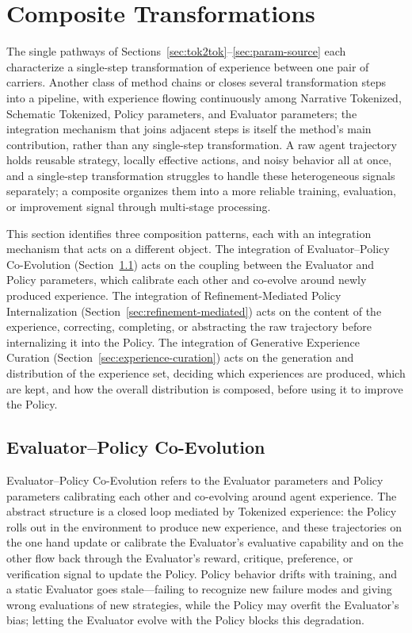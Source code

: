 \section{Composite Transformations}
\label{sec:composite}

The single pathways of Sections~\ref{sec:tok2tok}--\ref{sec:param-source} each characterize a single-step transformation of experience between one pair of carriers. Another class of method chains or closes several transformation steps into a pipeline, with experience flowing continuously among Narrative Tokenized, Schematic Tokenized, Policy parameters, and Evaluator parameters; the integration mechanism that joins adjacent steps is itself the method's main contribution, rather than any single-step transformation. A raw agent trajectory holds reusable strategy, locally effective actions, and noisy behavior all at once, and a single-step transformation struggles to handle these heterogeneous signals separately; a composite organizes them into a more reliable training, evaluation, or improvement signal through multi-stage processing.

This section identifies three composition patterns, each with an integration mechanism that acts on a different object. The integration of Evaluator--Policy Co-Evolution (Section~\ref{sec:coevolution}) acts on the coupling between the Evaluator and Policy parameters, which calibrate each other and co-evolve around newly produced experience. The integration of Refinement-Mediated Policy Internalization (Section~\ref{sec:refinement-mediated}) acts on the content of the experience, correcting, completing, or abstracting the raw trajectory before internalizing it into the Policy. The integration of Generative Experience Curation (Section~\ref{sec:experience-curation}) acts on the generation and distribution of the experience set, deciding which experiences are produced, which are kept, and how the overall distribution is composed, before using it to improve the Policy.

\subsection{Evaluator--Policy Co-Evolution}
\label{sec:coevolution}

Evaluator--Policy Co-Evolution refers to the Evaluator parameters and Policy parameters calibrating each other and co-evolving around agent experience. The abstract structure is a closed loop mediated by Tokenized experience: the Policy rolls out in the environment to produce new experience, and these trajectories on the one hand update or calibrate the Evaluator's evaluative capability and on the other flow back through the Evaluator's reward, critique, preference, or verification signal to update the Policy. Policy behavior drifts with training, and a static Evaluator goes stale---failing to recognize new failure modes and giving wrong evaluations of new strategies, while the Policy may overfit the Evaluator's bias; letting the Evaluator evolve with the Policy blocks this degradation.

